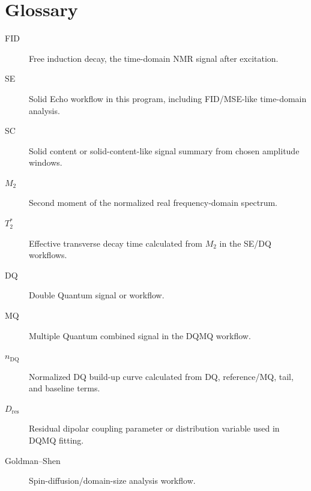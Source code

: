 \documentclass[11pt,a4paper]{article}
\newcommand{\TtwoStar}{\ensuremath{T_2^{\ast}}}
\newcommand{\Mtwo}{\ensuremath{M_2}}
\newcommand{\Dres}{\ensuremath{D_{\mathrm{res}}}}
\newcommand{\nDQ}{\ensuremath{n_{\mathrm{DQ}}}}
\begin{document}
\section{Glossary}
\begin{description}
  \item[FID] Free induction decay, the time-domain NMR signal after excitation.
  \item[SE] Solid Echo workflow in this program, including FID/MSE-like time-domain analysis.
  \item[SC] Solid content or solid-content-like signal summary from chosen amplitude windows.
  \item[\Mtwo] Second moment of the normalized real frequency-domain spectrum.
  \item[\TtwoStar] Effective transverse decay time calculated from \Mtwo{} in the SE/DQ workflows.
  \item[DQ] Double Quantum signal or workflow.
  \item[MQ] Multiple Quantum combined signal in the DQMQ workflow.
  \item[\nDQ] Normalized DQ build-up curve calculated from DQ, reference/MQ, tail, and baseline terms.
  \item[\Dres] Residual dipolar coupling parameter or distribution variable used in DQMQ fitting.
  \item[Goldman--Shen] Spin-diffusion/domain-size analysis workflow.
\end{description}
\end{document}
